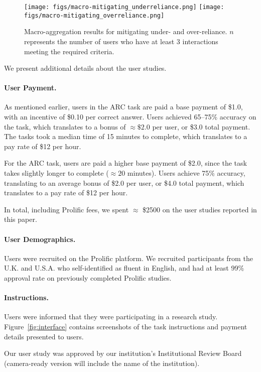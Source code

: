 \begin{figure*}[t]
    \centering
    \texttt{[image: figs/macro-mitigating\_underreliance.png]}
    \texttt{[image: figs/macro-mitigating\_overreliance.png]}
    \caption{Macro-aggregation results for mitigating under- and over-reliance. $n$ represents the number of users who have at least 3 interactions meeting the required criteria.}
    \label{fig:macro-aggregation}
\end{figure*}

We present additional details about the user studies.

\paragraph{User Payment.} As mentioned earlier, users in the ARC task are paid a base payment of \$1.0, with an incentive of \$0.10 per correct answer. 
Users achieved 65--75\% accuracy on the task, which translates to a bonus of $\approx \$2.0$ per user, or \$3.0 total payment. 
The tasks took a median time of 15 minutes to complete, which translates to a pay rate of \$12 per hour. 

For the ARC task, users are paid a higher base payment of \$2.0, since the task takes slightly longer to complete ($\approx 20$ minutes). 
Users achieve 75\% accuracy, translating to an average bonus of \$2.0 per user, or \$4.0 total payment, which translates to a pay rate of \$12 per hour.

In total, including Prolific fees, we spent $\approx$ \$2500 on the user studies reported in this paper.
 

\paragraph{User Demographics.} Users were recruited on the Prolific platform. We recruited participants from the U.K. and U.S.A. who self-identified as fluent in English, and had at least 99\% approval rate on previously completed Prolific studies. 

\paragraph{Instructions.} Users were informed that they were participating in a research study. Figure~\ref{fig:interface} contains screenshots of the task instructions and payment details presented to users.

Our user study was approved by our institution's Institutional Review Board (camera-ready version will include the name of the institution).